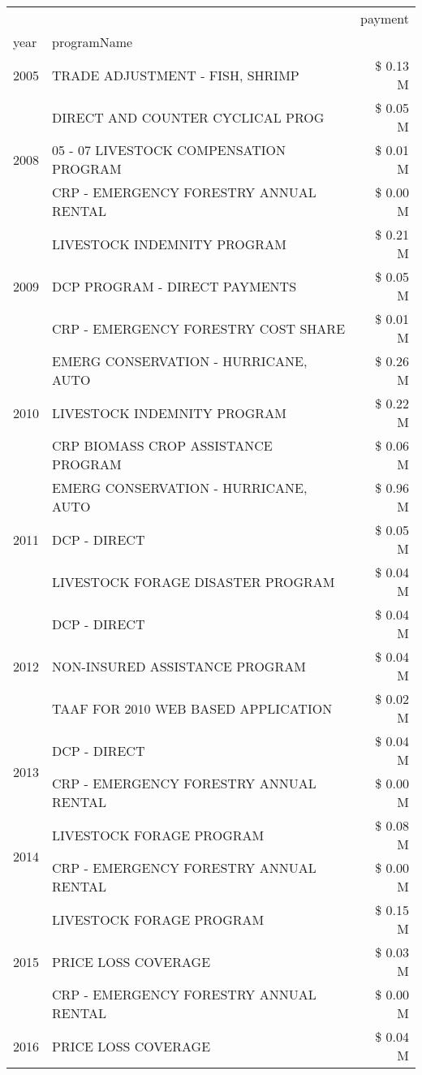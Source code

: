\begin{tabular}{llr}
\toprule
 &  & payment \\
year & programName &  \\
\midrule
2005 & TRADE ADJUSTMENT - FISH, SHRIMP & \$ 0.13 M \\
\cline{1-3}
\multirow[t]{3}{*}{2008} & DIRECT AND COUNTER CYCLICAL PROG & \$ 0.05 M \\
 & 05 - 07 LIVESTOCK COMPENSATION PROGRAM & \$ 0.01 M \\
 & CRP - EMERGENCY FORESTRY ANNUAL RENTAL & \$ 0.00 M \\
\cline{1-3}
\multirow[t]{3}{*}{2009} & LIVESTOCK INDEMNITY PROGRAM & \$ 0.21 M \\
 & DCP PROGRAM - DIRECT PAYMENTS & \$ 0.05 M \\
 & CRP - EMERGENCY FORESTRY COST SHARE & \$ 0.01 M \\
\cline{1-3}
\multirow[t]{3}{*}{2010} & EMERG CONSERVATION - HURRICANE, AUTO & \$ 0.26 M \\
 & LIVESTOCK INDEMNITY PROGRAM & \$ 0.22 M \\
 & CRP BIOMASS CROP ASSISTANCE PROGRAM & \$ 0.06 M \\
\cline{1-3}
\multirow[t]{3}{*}{2011} & EMERG CONSERVATION - HURRICANE, AUTO & \$ 0.96 M \\
 & DCP - DIRECT & \$ 0.05 M \\
 & LIVESTOCK FORAGE DISASTER PROGRAM & \$ 0.04 M \\
\cline{1-3}
\multirow[t]{3}{*}{2012} & DCP - DIRECT & \$ 0.04 M \\
 & NON-INSURED ASSISTANCE PROGRAM & \$ 0.04 M \\
 & TAAF FOR 2010 WEB BASED APPLICATION & \$ 0.02 M \\
\cline{1-3}
\multirow[t]{2}{*}{2013} & DCP - DIRECT & \$ 0.04 M \\
 & CRP - EMERGENCY FORESTRY ANNUAL RENTAL & \$ 0.00 M \\
\cline{1-3}
\multirow[t]{2}{*}{2014} & LIVESTOCK FORAGE PROGRAM & \$ 0.08 M \\
 & CRP - EMERGENCY FORESTRY ANNUAL RENTAL & \$ 0.00 M \\
\cline{1-3}
\multirow[t]{3}{*}{2015} & LIVESTOCK FORAGE PROGRAM & \$ 0.15 M \\
 & PRICE LOSS COVERAGE & \$ 0.03 M \\
 & CRP - EMERGENCY FORESTRY ANNUAL RENTAL & \$ 0.00 M \\
\cline{1-3}
\multirow[t]{2}{*}{2016} & PRICE LOSS COVERAGE & \$ 0.04 M \\

\end{tabular}
